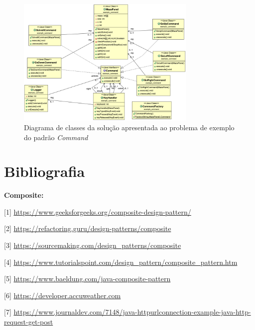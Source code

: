 \documentclass[10pt,portuguese]{article}
\begin{document}
\begin{figure}[!h]
    \centering
    \includegraphics[width=325]{images/command/UML_Example.png}
    \caption{Diagrama de classes da solução apresentada ao problema de exemplo do padrão \textit{Command}}
\end{figure}


\clearpage

\section{Bibliografia}





\vspace{5mm} %

\par \textbf{Composite:}

[1] \url{https://www.geeksforgeeks.org/composite-design-pattern/}

[2] \url{https://refactoring.guru/design-patterns/composite}

[3] \url{https://sourcemaking.com/design_patterns/composite}

[4] \url{https://www.tutorialspoint.com/design_pattern/composite_pattern.htm}

[5] \url{https://www.baeldung.com/java-composite-pattern}

[6] \url{https://developer.accuweather.com}

[7] \url{https://www.journaldev.com/7148/java-httpurlconnection-example-java-http-request-get-post}
\end{document}
